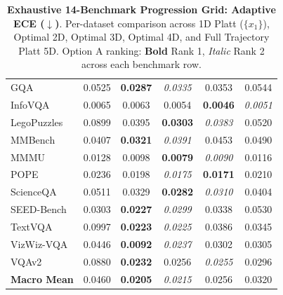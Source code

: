 \begin{table}[t]
\begin{tabular}{lccccc}
GQA & 0.0525 & \textbf{0.0287} & \textit{0.0335} & 0.0353 & 0.0544 \\
InfoVQA & 0.0065 & 0.0063 & 0.0054 & \textbf{0.0046} & \textit{0.0051} \\
LegoPuzzles & 0.0899 & 0.0395 & \textbf{0.0303} & \textit{0.0383} & 0.0520 \\
MMBench & 0.0407 & \textbf{0.0321} & \textit{0.0391} & 0.0453 & 0.0490 \\
MMMU & 0.0128 & 0.0098 & \textbf{0.0079} & \textit{0.0090} & 0.0116 \\
POPE & 0.0236 & 0.0198 & \textit{0.0175} & \textbf{0.0171} & 0.0210 \\
ScienceQA & 0.0511 & 0.0329 & \textbf{0.0282} & \textit{0.0310} & 0.0404 \\
SEED-Bench & 0.0303 & \textbf{0.0227} & \textit{0.0299} & 0.0338 & 0.0530 \\
TextVQA & 0.0997 & \textbf{0.0223} & \textit{0.0225} & 0.0386 & 0.0345 \\
VizWiz-VQA & 0.0446 & \textbf{0.0092} & \textit{0.0237} & 0.0302 & 0.0305 \\
VQAv2 & 0.0880 & \textbf{0.0232} & 0.0256 & \textit{0.0255} & 0.0296 \\
\midrule
\textbf{Macro Mean} & 0.0460 & \textbf{0.0205} & \textit{0.0215} & 0.0256 & 0.0320 \\
\bottomrule
\end{tabular}
\caption{\textbf{Exhaustive 14-Benchmark Progression Grid: Adaptive ECE ($\downarrow$)}. Per-dataset comparison across 1D Platt ($\{x_1\}$), Optimal 2D, Optimal 3D, Optimal 4D, and Full Trajectory Platt 5D. Option A ranking: \textbf{Bold} Rank 1, \textit{Italic} Rank 2 across each benchmark row.}
\label{tab:ablation_5d_14ds_grid}
\end{table}
